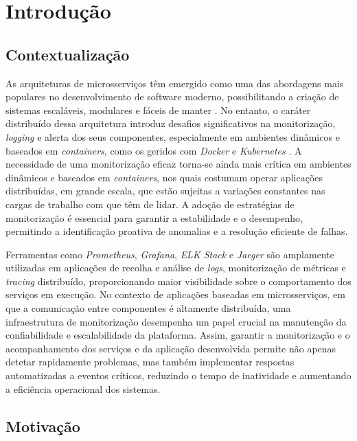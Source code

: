 \chapter{Introdução}

\section{Contextualização}

As arquiteturas de microsserviços têm emergido como uma das abordagens mais populares no desenvolvimento de software moderno, possibilitando a criação de sistemas escaláveis, modulares e fáceis de manter \cite{Larrucea2018}. No entanto, o caráter distribuído dessa arquitetura introduz desafios significativos na monitorização, \textit{logging} e alerta dos seus componentes, especialmente em ambientes dinâmicos e baseados em \textit{containers}, como os geridos com \textit{Docker} e \textit{Kubernetes} \cite{Liu2020}. A necessidade de uma monitorização eficaz torna-se ainda mais crítica em ambientes dinâmicos e baseados em \textit{containers}, nos quais costumam operar aplicações distribuídas, em grande escala, que estão sujeitas a variações constantes nas cargas de trabalho com que têm de lidar. A adoção de estratégias de monitorização é essencial para garantir a estabilidade e o desempenho, permitindo a identificação proativa de anomalias e a resolução eficiente de falhas.

Ferramentas como \textit{Prometheus}, \textit{Grafana}, \textit{ELK Stack} e \textit{Jaeger} são amplamente utilizadas em aplicações de recolha e análise de \textit{logs}, monitorização de métricas e \textit{tracing} distribuído, proporcionando maior visibilidade sobre o comportamento dos serviços em execução. No contexto de aplicações baseadas em microsserviços, em que a comunicação entre componentes é altamente distribuída, uma infraestrutura de monitorização desempenha um papel crucial na manutenção da confiabilidade e escalabilidade da plataforma. Assim, garantir a monitorização e o acompanhamento dos serviços e da aplicação desenvolvida permite não apenas detetar rapidamente problemas, mas também implementar respostas automatizadas a eventos críticos, reduzindo o tempo de inatividade e aumentando a eficiência operacional dos sistemas.



\section{Motivação}

